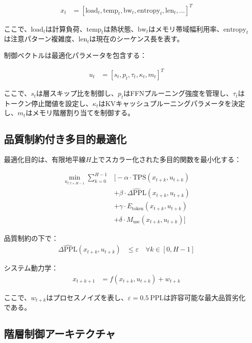 \documentclass[10pt,twocolumn,a4paper]{jarticle}
\newcommand{\ppl}{\mathrm{PPL}}
\begin{document}
\begin{align}
x_t &= [\text{load}_t, \text{temp}_t, \text{bw}_t, \text{entropy}_t, \text{len}_t, \ldots]^T \label{eq:state}
\end{align}

ここで、$\text{load}_t$は計算負荷、$\text{temp}_t$は熱状態、$\text{bw}_t$はメモリ帯域幅利用率、$\text{entropy}_t$は注意パターン複雑度、$\text{len}_t$は現在のシーケンス長を表す。

制御ベクトルは最適化パラメータを包含する：

\begin{align}
u_t &= [s_t, p_t, \tau_t, \kappa_t, m_t]^T \label{eq:control}
\end{align}

ここで、$s_t$は層スキップ比を制御し、$p_t$はFFNプルーニング強度を管理し、$\tau_t$はトークン停止閾値を設定し、$\kappa_t$はKVキャッシュプルーニングパラメータを決定し、$m_t$はメモリ階層割り当てを制御する。

\subsection{品質制約付き多目的最適化}

最適化目的は、有限地平線$H$上でスカラー化された多目的関数を最小化する：

\begin{align}
\min_{u_{t:t+H-1}} \sum_{k=0}^{H-1} &\Big[ -\alpha \cdot \text{TPS}(x_{t+k}, u_{t+k}) \nonumber \\
&+ \beta \cdot \widehat{\Delta\ppl}(x_{t+k}, u_{t+k}) \nonumber \\
&+ \gamma \cdot E_{\text{token}}(x_{t+k}, u_{t+k}) \nonumber \\
&+ \delta \cdot M_{\text{use}}(x_{t+k}, u_{t+k}) \Big] \label{eq:objective}
\end{align}

品質制約の下で：
\begin{align}
\widehat{\Delta\ppl}(x_{t+k}, u_{t+k}) &\leq \varepsilon \quad \forall k \in [0, H-1] \label{eq:quality_constraint}
\end{align}

システム動力学：
\begin{align}
x_{t+k+1} &= f(x_{t+k}, u_{t+k}) + w_{t+k} \label{eq:dynamics}
\end{align}

ここで、$w_{t+k}$はプロセスノイズを表し、$\varepsilon = \SI{0.5}{\ppl}$は許容可能な最大品質劣化である。

\subsection{階層制御アーキテクチャ}
\end{document}
